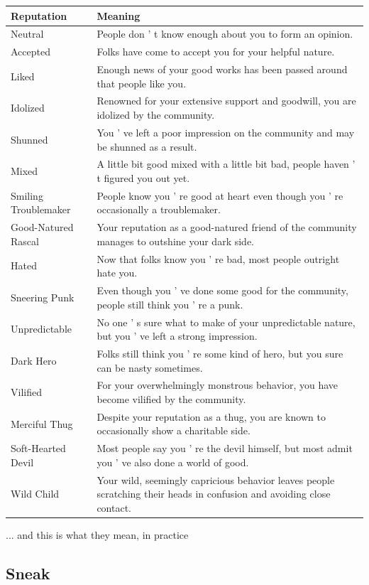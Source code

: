 \documentclass[11pt]{article} %
\begin{document}
\begin{longtable}{|p{3cm}|p{9cm}|}
\hline
\bfseries Reputation & \bfseries Meaning \\
\hline
Neutral & People don ' t know enough about you to form an opinion. \\
Accepted & Folks have come to accept you for your helpful nature. \\
Liked & Enough news of your good works has been passed around that people like you. \\
Idolized & Renowned for your extensive support and goodwill, you are idolized by the community. \\
Shunned & You ' ve left a poor impression on the community and may be shunned as a result. \\
Mixed & A little bit good mixed with a little bit bad, people haven ' t figured you out yet. \\
Smiling Troublemaker & People know you ' re good at heart even though you ' re occasionally a troublemaker. \\
Good-Natured Rascal & Your reputation as a good-natured friend of the community manages to outshine your dark side. \\
Hated & Now that folks know you ' re bad, most people outright hate you. \\
Sneering Punk & Even though you ' ve done some good for the community, people still think you ' re a punk. \\
Unpredictable & No one ' s sure what to make of your unpredictable nature, but you ' ve left a strong impression. \\
Dark Hero & Folks still think you ' re some kind of hero, but you sure can be nasty sometimes. \\
Vilified & For your overwhelmingly monstrous behavior, you have become vilified by the community. \\
Merciful Thug & Despite your reputation as a thug, you are known to occasionally show a charitable side. \\
Soft-Hearted Devil & Most people say you ' re the devil himself, but most admit you ' ve also done a world of good. \\
Wild Child & Your wild, seemingly capricious behavior leaves people scratching their heads in confusion and avoiding close contact. \\
\hline
\end{longtable}{... and this is what they mean, in practice}

\subsection{Sneak}
\end{document}
